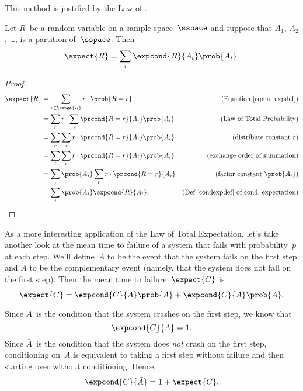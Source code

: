This method is justified by the Law of .

\begin{theorem}\label{total_expect}
Let $R$~be a random variable on a sample space~$\sspace$ and suppose
that $A_1$, $A_2$, \dots, is a partition of~$\sspace$.  Then
\begin{equation*}
    \expect{R} = \sum_i \expcond{R}{A_i} \prob{A_i}.
\end{equation*}
\end{theorem}

\begin{proof}
  \begin{align*}
    \expect{R} &= \sum_{r \in \range{R}} r \cdot \prob{R=r}
                  & \text{(Equation~\ref{eqn:altexpdef})}\\
    &= \sum_r r \cdot \sum_i \prcond{R=r}{A_i} \prob{A_i}
            & \text{(Law of Total Probability)}\\
    &= \sum_r \sum_i r \cdot \prcond{R=r}{A_i} \prob{A_i}
              & \text{(distribute constant $r$)}\\
    &= \sum_i \sum_r r \cdot \prcond{R=r}{A_i} \prob{A_i}
              & \text{(exchange order of summation)}\\
    &= \sum_i \prob{A_i} \sum_r r \cdot \prcond{R=r}{A_i}
             & \text{(factor constant $\prob{A_i}$)}\\
    &= \sum_i \prob{A_i} \expcond{R}{A_i}.
             & \text{(Def~\ref{condexpdef} of cond.\ expectation)}
  \end{align*}
\end{proof}

As a more interesting application of the Law of Total Expectation,
let's take another look at the mean time to failure of a system that
fails with probability~$p$ at each step.  We'll define~$A$ to be the
event that the system fails on the first step and $\bar{A}$ to be the
complementary event (namely, that the system does not fail on the
first step).  Then the mean time to failure~$\expect{C}$ is
\begin{equation}\label{eqn:17Y3}
    \expect{C} = \expcond{C}{A} \prob{A} + \expcond{C}{\bar{A}} \prob{\bar{A}}.
\end{equation}

Since $A$~is the condition that the system crashes on the first
step, we know that
\begin{equation}\label{eqn:17Y1}
    \expcond{C}{A} = 1.
\end{equation}
Since $\bar{A}$~is the condition that the system does \emph{not} crash on
the first step, conditioning on~$\bar{A}$ is equivalent to taking a first
step without failure and then starting over without conditioning.
Hence,
\begin{equation}\label{eqn:17Y2}
    \expcond{C}{\bar{A}} = 1 + \expect{C}.
\end{equation}

